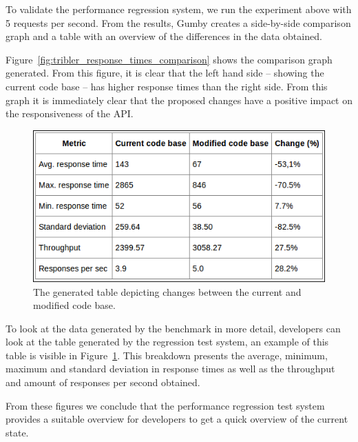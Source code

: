 To validate the performance regression system, we run the experiment above with 5 requests per second.
From the results, Gumby creates a side-by-side comparison graph and a table with an overview of the differences in the data obtained.

Figure~\ref{fig:tribler_response_times_comparison} shows the comparison graph generated.
From this figure, it is clear that the left hand side -- showing the current code base -- has higher response times than the right side.
From this graph it is immediately clear that the proposed changes have a positive impact on the responsiveness of the API.

\begin{figure}[!h]
	\centering
	\includegraphics[width=\linewidth]{experimentation/images/table_changes}
	\caption{The generated table depicting changes between the current and modified code base.}
	\label{fig:compare_table}
\end{figure} 

To look at the data generated by the benchmark in more detail, developers can look at the table generated by the regression test system, an example of this table is visible in Figure~\ref{fig:compare_table}.
This breakdown presents the average, minimum, maximum and standard deviation in response times as well as the throughput and amount of responses per second obtained.

From these figures we conclude that the performance regression test system provides a suitable overview for developers to get a quick overview of the current state.
		
